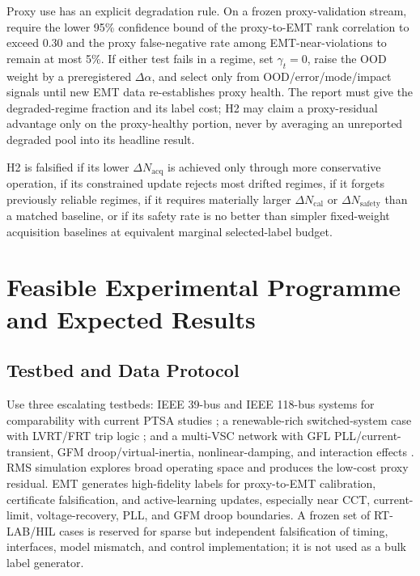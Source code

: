 \documentclass[conference]{IEEEtran}
\begin{document}
Proxy use has an explicit degradation rule. On a frozen proxy-validation stream, require the lower 95\% confidence bound of the proxy-to-EMT rank correlation to exceed 0.30 and the proxy false-negative rate among EMT-near-violations to remain at most 5\%. If either test fails in a regime, set $\gamma_t=0$, raise the OOD weight by a preregistered $\Delta\alpha$, and select only from OOD/error/mode/impact signals until new EMT data re-establishes proxy health. The report must give the degraded-regime fraction and its label cost; H2 may claim a proxy-residual advantage only on the proxy-healthy portion, never by averaging an unreported degraded pool into its headline result.

H2 is falsified if its lower $\Delta N_{\mathrm{acq}}$ is achieved only through more conservative operation, if its constrained update rejects most drifted regimes, if it forgets previously reliable regimes, if it requires materially larger $\Delta N_{\mathrm{cal}}$ or $\Delta N_{\mathrm{safety}}$ than a matched baseline, or if its safety rate is no better than simpler fixed-weight acquisition baselines at equivalent marginal selected-label budget.

\section{Feasible Experimental Programme and Expected Results}

\subsection{Testbed and Data Protocol}

Use three escalating testbeds: IEEE 39-bus and IEEE 118-bus systems for comparability with current PTSA studies \cite{lu2025}; a renewable-rich switched-system case with LVRT/FRT trip logic \cite{mishra2019}; and a multi-VSC network with GFL PLL/current-transient, GFM droop/virtual-inertia, nonlinear-damping, and interaction effects \cite{chen2020,wang2024}. RMS simulation explores broad operating space and produces the low-cost proxy residual. EMT generates high-fidelity labels for proxy-to-EMT calibration, certificate falsification, and active-learning updates, especially near CCT, current-limit, voltage-recovery, PLL, and GFM droop boundaries. A frozen set of RT-LAB/HIL cases is reserved for sparse but independent falsification of timing, interfaces, model mismatch, and control implementation; it is not used as a bulk label generator.
\end{document}
